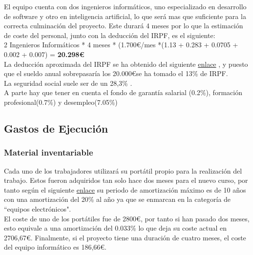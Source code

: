 El equipo cuenta con dos ingenieros informáticos, uno especializado en desarrollo de software y otro en inteligencia artificial, lo que será mas que suficiente para la correcta culminación del proyecto. Este durará 4 meses por lo que la estimación de coste del personal, junto con la deducción del IRPF, es el siguiente: \\

2 Ingenieros Informáticos * 4 meses * (1.700\euro /mes *(1.13 + 0.283 + 0.0705 + 0.002 + 0.007) = \textbf{20.298\euro} \\

La deducción aproximada del IRPF se ha obtenido del siguiente \href{https://infoautonomos.eleconomista.es/contratar-trabajadores/calcular-retenciones-IRPF-nominas/}{enlace} \cite{misc:IRPF}, y puesto que el sueldo anual sobrepasaría los 20.000\euro se ha tomado el 13\% de IRPF. \\

La seguridad social suele ser de un 28,3\% \cite{misc:social}. \\

A parte hay que tener en cuenta el fondo de garantía salarial (0.2\%), formación profesional(0.7\%) y desempleo(7.05\%) \cite{misc:impuestos} \\

\subsection{Gastos de Ejecución}

\subsubsection{Material inventariable}

Cada uno de los trabajadores utilizará su portátil propio para la realización del trabajo. Estos fueron adquiridos tan solo hace dos meses para el nuevo curso, por tanto según el siguiente \href{https://cuentica.com/asesoria/tabla-anos-y-porcentajes-de-amortizacion-sociedades-a-partir-de-2015/}{enlace} \cite{misc:amortizacion} su periodo de amortización máximo es de 10 años con una amortización del 20\% al año ya que se enmarcan en la categoría de ``equipos electrónicos". \\

El coste de uno de los portátiles fue de  2800\euro, por tanto si han pasado dos meses, esto equivale a una amortización del 0.033\% lo que deja su coste actual en 2706,67\euro. Finalmente, si el proyecto tiene una duración de cuatro meses, el coste del equipo informático es 186,66\euro.

